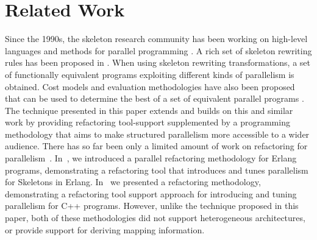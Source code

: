 \documentclass[smallextended]{svjour3}
\begin{document}
\section{Related Work}
Since the 1990s, the skeleton research community has been
working on high-level languages and methods for parallel programming
\cite{cole-th}.
A rich set of skeleton rewriting rules has been proposed in \cite{FAN:PPA:01,SkillicornC95}.
When using skeleton rewriting transformations, a set of functionally equivalent programs 
exploiting different kinds of parallelism is obtained. Cost models and evaluation
methodologies have also been proposed that can be used to determine the best of a set of 
equivalent parallel programs \cite{aldinuc:stream-data:98,SkillicornC95}. 
The technique presented in this paper extends and builds on this
and similar work by providing refactoring tool-support
supplemented by a programming methodology that
aims to make structured parallelism more accessible to a wider audience.
%
There has so far been only a limited amount of work on refactoring for parallelism~\cite{fmcoover}. 
In~\cite{hlpp}, we introduced a parallel refactoring methodology
for Erlang programs, demonstrating a refactoring tool that introduces and tunes
parallelism for Skeletons in Erlang. In~\cite{pdp} we presented
a refactoring methodology, demonstrating a refactoring
tool support approach for introducing and tuning parallelism for C++ programs.
However, unlike the technique proposed in this paper, both of these methodologies did not support
heterogeneous architectures, or provide support for deriving mapping information.
\end{document}

